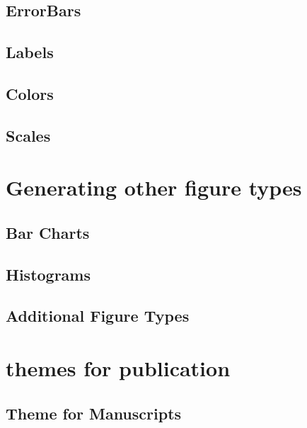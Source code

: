 \documentclass[nojss]{jss}\usepackage[]{graphicx}\usepackage[]{color}
\begin{document}
\subsection{ErrorBars}\label{S:errorbars}

\subsection{Labels}\label{S:labels}

\subsection{Colors}\label{S:colors}


\subsection{Scales}\label{S:scales}

\section{Generating other figure types}\label{S:alternateFigures}

\subsection{Bar Charts}

\subsection{Histograms}

\subsection{Additional Figure Types}


\section[Themes for publications]{ themes for publication}\label{S:themes}

\subsection{Theme for Manuscripts}
\end{document}
